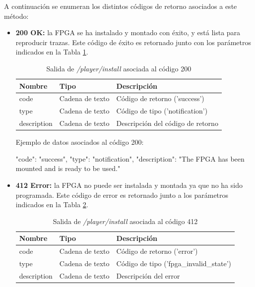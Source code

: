 A continuación se enumeran los distintos códigos de retorno asociados a este método:
\begin{itemize}

\item{\textbf{200 OK:} la \gls{FPGA} se ha instalado y montado con éxito, y está lista para reproducir \glspl{traza}. Este código de éxito es retornado junto con los parámetros indicados en la Tabla \ref{extra:api:playerinstall:ok}.
\begin{table}[H]
\centering
\begin{tabular}{|l|l|l|}
\hline
\rowcolor[HTML]{F5F5F5}
\textbf{Nombre}  & \textbf{Tipo}   & \textbf{Descripción}              \\ \hline
code             & Cadena de texto & Código de retorno ('success')     \\ \hline
type             & Cadena de texto & Código de tipo ('notification')   \\ \hline
description      & Cadena de texto & Descripción del código de retorno \\ \hline
\end{tabular}
\caption{Salida de \textit{/player/install} asociada al código 200}
\label{extra:api:playerinstall:ok}
\end{table}
\begin{minipage}{\textwidth}
Ejemplo de datos asociados al código 200:

\begin{code}[language=json]
{
  "code": "success",
  "type": "notification",
  "description": "The FPGA has been mounted and is ready to be used."
}
\end{code}
\end{minipage}
}

\item{\textbf{412 Error:} la \gls{FPGA} no puede ser instalada y montada ya que no ha sido programada. Este código de error es retornado junto a los parámetros indicados en la Tabla \ref{extra:api:playerinstall:error}.
\begin{table}[H]
\centering
\begin{tabular}{|l|l|l|}
\hline
\rowcolor[HTML]{F5F5F5}
\textbf{Nombre}  & \textbf{Tipo}   & \textbf{Descripción}                    \\ \hline
code             & Cadena de texto & Código de retorno ('error')             \\ \hline
type             & Cadena de texto & Código de tipo ('fpga\_invalid\_state') \\ \hline
description      & Cadena de texto & Descripción del error                   \\ \hline
\end{tabular}
\caption{Salida de \textit{/player/install} asociada al código 412}
\label{extra:api:playerinstall:error}
\end{table}

}
\end{itemize}
